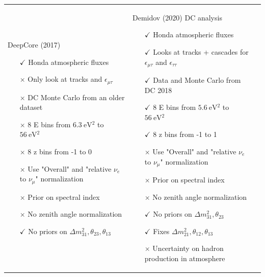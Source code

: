 \documentclass[draft=True]{revtex4-2}
\newcommand{\emt}{\ensuremath{\epsilon_{\mu\tau}}}
\newcommand{\ett}{\ensuremath{\epsilon_{\tau\tau}}}
\renewcommand{\ne}{\nu_e}
\newcommand{\nm}{\nu_\mu}
\newcommand{\dm}{\Delta m^2_{31}}
\begin{document}

 \newpage
\begin{tabular}{p{55mm}p{55mm}p{55mm}}
   DeepCore (2017)
      \begin{itemize}
         \item[$\checkmark$] Honda atmospheric fluxes
         \item[$\times$] Only look at tracks and $\emt$
         \vspace{1em}  
         \item[$\times$] DC Monte Carlo from an older dataset 
         \item[$\times$] 8 E bins from $\SI{6.3}{\electronvolt^2}$ to $\SI{56}{\electronvolt^2}$
         \item[$\times$] 8 z bins from -1 to 0 
         \item[$\times$] Use "Overall" and "relative $\ne$ to $\nm$" normalization
         \item[$\times$] Prior on spectral index
         \item[$\times$] No zenith angle normalization
         \item[$\checkmark$] No priors on $\dm, \theta_{23},\theta_{13}$
      \end{itemize} &
    Demidov (2020) DC analysis
      \begin{itemize}
         \item[$\checkmark$] Honda atmospheric fluxes
         \item[$\checkmark$] Looks at tracks + cascades for $\emt$ and $\ett$
         \item[$\checkmark$] Data and Monte Carlo from DC 2018
         \item[$\checkmark$] 8 E bins from $\SI{5.6}{\electronvolt^2}   $ to $\SI{56}{\electronvolt^2}$
         \item[$\checkmark$] 8 z bins from -1 to 1
         \item[$\times$] Use "Overall" and "relative $\ne$ to $\nm$" normalization
         \item[$\times$] Prior on spectral index
         \item[$\times$] No zenith angle normalization
         \item[$\checkmark$] No priors on $\dm, \theta_{23}$
         \item[$\checkmark$] Fixes $\Delta m^2_{21}, \theta_{12}, \theta_{13}$
         \item[$\times$] Uncertainty on hadron production in atmosphere

\end{itemize}
\end{tabular}
\end{document}
